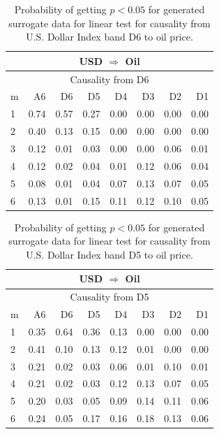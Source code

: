 %
%
\begin{table}[H]
\begin{center}
\begin{tabular}{l|r r r r r r r}
\hline\hline
\multicolumn{8}{c}{USD $\Rightarrow$ Oil}\\
\hline
\multicolumn{8}{c}{Causality from D6}\\
\hline\hline
m & A6 & D6 & D5 & D4 & D3 & D2 & D1 \\
\hline
1 & 0.74 & \cellcolor{mygrey}0.57 & 0.27 & 0.00 & 0.00 & 0.00 & 0.00 \\
2 & \cellcolor{mygrey}0.40 & 0.13 & 0.15 & 0.00 & 0.00 & 0.00 & 0.00 \\
3 & 0.12 & 0.01 & 0.03 & 0.00 & 0.00 & 0.06 & 0.01 \\
4 & 0.12 & 0.02 & 0.04 & 0.01 & 0.12 & 0.06 & 0.04 \\
5 & 0.08 & 0.01 & 0.04 & 0.07 & 0.13 & 0.07 & 0.05 \\
6 & 0.13 & 0.01 & 0.15 & 0.11 & 0.12 & 0.10 & 0.05 \\
\hline\hline
\end{tabular}
\caption{Probability of getting $p < 0.05$ for generated surrogate data for linear test for causality from U.S. Dollar Index band D6 to oil price.}
\end{center}
\end{table}

%
%
\begin{table}[H]
\begin{center}
\begin{tabular}{l|r r r r r r r}
\hline\hline
\multicolumn{8}{c}{USD $\Rightarrow$ Oil}\\
\hline
\multicolumn{8}{c}{Causality from D5}\\
\hline\hline
m & A6 & D6 & D5 & D4 & D3 & D2 & D1 \\
\hline
1 & \cellcolor{mygrey}0.35 & \cellcolor{mygrey}0.64 & \cellcolor{mygrey}0.36 & 0.13 & 0.00 & 0.00 & 0.00 \\
2 & 0.41 & 0.10 & 0.13 & 0.12 & 0.01 & 0.00 & 0.00 \\
3 & 0.21 & 0.02 & 0.03 & 0.06 & 0.01 & 0.10 & 0.01 \\
4 & 0.21 & 0.02 & 0.03 & 0.12 & 0.13 & 0.07 & 0.05 \\
5 & 0.20 & 0.03 & 0.05 & 0.09 & 0.14 & 0.11 & 0.06 \\
6 & 0.24 & 0.05 & 0.17 & 0.16 & 0.18 & 0.13 & 0.06 \\
\hline\hline
\end{tabular}
\caption{Probability of getting $p < 0.05$ for generated surrogate data for linear test for causality from U.S. Dollar Index band D5 to oil price.}
\end{center}
\end{table}

